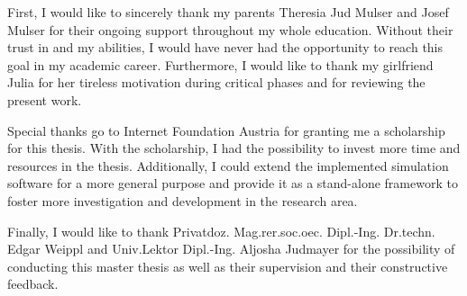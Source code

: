 First, I would like to sincerely thank my parents Theresia Jud Mulser and Josef Mulser for their ongoing support throughout my whole education. Without their trust in and my abilities, I would have never had the opportunity to reach this goal in my academic career. Furthermore, I would like to thank my girlfriend Julia for her tireless motivation during critical phases and for reviewing the present work.

\bigskip

Special thanks go to Internet Foundation Austria for granting me a scholarship for this thesis. With the scholarship, I had the possibility to invest more time and resources in the thesis. Additionally, I could extend the implemented simulation software for a more general purpose and provide it as a stand-alone framework to foster more investigation and development in the research area.

Finally, I would like to thank Privatdoz. Mag.rer.soc.oec. Dipl.-Ing. Dr.techn. Edgar Weippl and Univ.Lektor Dipl.-Ing. Aljosha Judmayer for the possibility of conducting this master thesis as well as their supervision and their constructive feedback.

